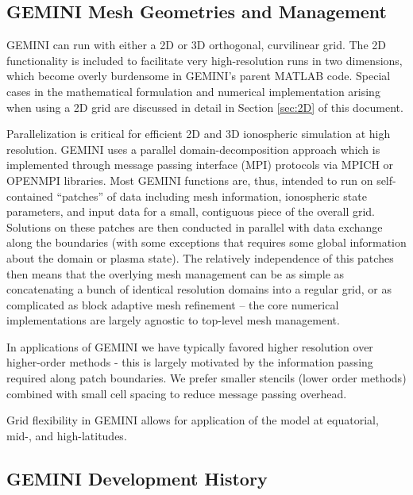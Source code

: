 \documentclass[11pt,letterpaper]{article}
\begin{document}
\subsection{GEMINI Mesh Geometries and Management}

GEMINI can run with either a 2D or 3D orthogonal, curvilinear grid.  The 2D functionality is included to facilitate very high-resolution runs in two dimensions, which become overly burdensome in GEMINI's parent MATLAB code.  Special cases in the mathematical formulation and numerical implementation arising when using a 2D grid are discussed in detail in Section \ref{sec:2D} of this document.  

Parallelization is critical for efficient 2D and 3D ionospheric simulation at high resolution.  GEMINI uses a parallel domain-decomposition approach which is implemented through message passing interface (MPI) protocols via MPICH or OPENMPI libraries.  Most GEMINI functions are, thus, intended to run on self-contained ``patches'' of data including mesh information, ionospheric state parameters, and input data for a small, contiguous piece of the overall grid.  Solutions on these patches are then conducted in parallel with data exchange along the boundaries (with some exceptions that requires some global information about the domain or plasma state).  The relatively independence of this patches then means that the overlying mesh management can be as simple as concatenating a bunch of identical resolution domains into a regular grid, or as complicated as block adaptive mesh refinement -- the core numerical implementations are largely agnostic to top-level mesh management.  

In applications of GEMINI we have typically favored higher resolution over higher-order methods - this is largely motivated by the information passing required along patch boundaries.  We prefer smaller stencils (lower order methods) combined with small cell spacing to reduce message passing overhead.  

Grid flexibility in GEMINI allows for application of the model at equatorial, mid-, and high-latitudes.  

\subsection{GEMINI Development History}
\end{document}
